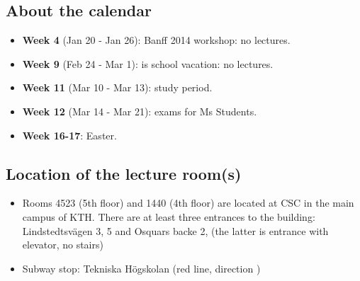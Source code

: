 \documentclass[a4paper,justified]{tufte-handout}
\begin{document}
\subsection{About the calendar}
\label{sec-1-1}


\begin{itemize}
\item \textbf{Week  4} (Jan 20 - Jan 26): Banff 2014 workshop: no lectures.
\item \textbf{Week  9} (Feb 24 - Mar  1): is school vacation: no lectures.
\item \textbf{Week 11} (Mar 10 - Mar 13): study period.
\item \textbf{Week 12} (Mar 14 - Mar 21): exams for Ms Students.
\item \textbf{Week 16-17}: Easter.
\end{itemize}
\subsection{Location of the lecture room(s)}
\label{sec-1-2}


\begin{itemize}
\item Rooms 4523 (5th floor) and 1440 (4th floor) are located at CSC in
     the main campus of KTH. There are at least three entrances to the
     building: 
     Lindstedtsvägen 3, 5 and Osquars backe 2, (the latter is entrance
     with elevator, no stairs)
\item Subway stop: Tekniska Högskolan (red line, direction )
\end{itemize}
\end{document}
